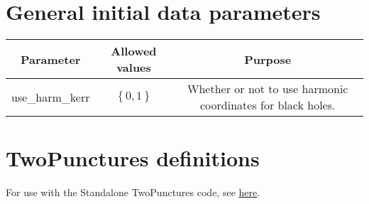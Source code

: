 \documentclass{article}
\begin{document}
\newpage
\section*{General initial data parameters}
\begin{table}[h]
   \centering 
   \begin{tabular}{ccc}
      Parameter  & Allowed values & Purpose \\
      \midrule\midrule
      use\_harm\_kerr
      &
      $\left\{0,1\right\}$
      &
      Whether or not to use harmonic coordinates for black holes.
   \end{tabular}
\end{table}

\newpage
\section*{TwoPunctures definitions}

For use with the Standalone TwoPunctures code,
see \href{https://github.com/JLRipley314/Standalone-TwoPunctures-C-Cpp}{here}.
\end{document}
